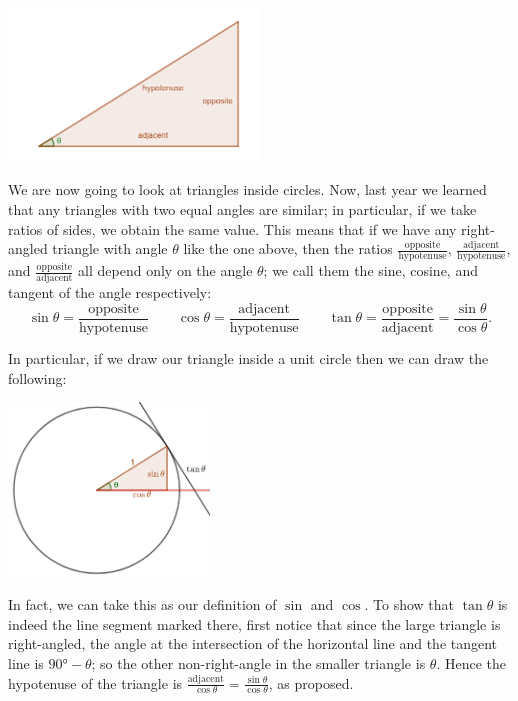 



\begin{center}
  \includegraphics[width=0.5\textwidth]{trig}
\end{center}
We are now going to look at triangles inside circles. Now, last year we learned that any triangles with two equal angles are similar; in particular,
if we take ratios of sides, we obtain the same value. This means that if we have any right-angled triangle with angle $ \theta $ like the one above,
then the ratios $ \frac{\text{opposite}}{\text{hypotenuse}} $, $ \frac{\text{adjacent}}{\text{hypotenuse}} $, and $ \frac{\text{opposite}}{\text{adjacent}} $
all depend only on the angle $ \theta $; we call them the sine, cosine, and tangent of the angle respectively:
\begin{displaymath}
  \sin \theta = \frac{\text{opposite}}{\text{hypotenuse}}\qquad \cos \theta = \frac{\text{adjacent}}{\text{hypotenuse}} \qquad \tan \theta = \frac{\text{opposite}}{\text{adjacent}} = \frac{\sin\theta}{\cos\theta}.
\end{displaymath}

In particular, if we draw our triangle inside a unit circle then we can draw the following:
\begin{center}
  \includegraphics[width=0.4\textwidth]{trigfns}
\end{center}
In fact, we can take this as our definition of $ \sin $ and $ \cos $. To show that $ \tan \theta $ is indeed the line segment marked there,
first notice that since the large triangle is right-angled, the angle at the intersection of the horizontal line and the tangent line
is $ \ang{90} - \theta $; so the other non-right-angle in the smaller triangle is $ \theta $. Hence the hypotenuse of the triangle
is $ \frac{\text{adjacent}}{\cos \theta} = \frac{\sin\theta}{\cos\theta} $, as proposed.

